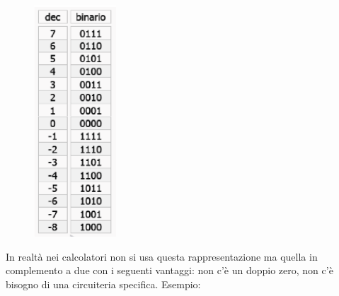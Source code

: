 \documentclass[
  paper=a4,
  oneside  ,captions=tableheading
]{scrbook}
\begin{document}
\begin{figure}
\includegraphics[width=0.9\linewidth]{./image/image-20201212111232217.png}
\end{figure}
In realtà nei calcolatori non si usa questa rappresentazione ma quella
in complemento a due con i seguenti vantaggi: non c'è un doppio zero,
non c'è bisogno di una circuiteria specifica. Esempio:
\end{document}

